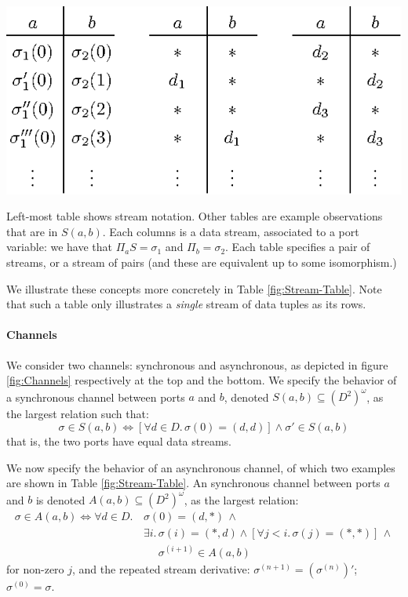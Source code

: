 \begin{table}[b]
	\begin{center}
		\includegraphics[scale=0.8]{pic/stream-table}
	\end{center}
	\caption{
		\label{fig:Stream-Table}Left-most table shows stream notation. Other tables are example observations that are in $S(a,b)$.  Each columns is a data stream, associated to a port variable: we have that $\Pi_a S=\sigma_1$ and $\Pi_b=\sigma_2$. Each table specifies a pair of streams, or a stream of pairs (and these are equivalent up to some isomorphism.)}
\end{table}

We illustrate these concepts more concretely in Table \ref{fig:Stream-Table}.
Note that such a table only illustrates a \emph{single} stream of data tuples as its rows.

\paragraph{Channels} We consider two channels: synchronous and asynchronous,
as depicted in figure \ref{fig:Channels} respectively at the top and the bottom.
We specify the behavior of a synchronous channel between ports $a$ and $b$, denoted $S(a,b)\subseteq(D^2)^{\omega}$, as the largest relation such that:
$$\sigma\in S(a,b)\Leftrightarrow\left[\forall d\in D.\,\sigma(0)=(d,d)\right]\land\sigma'\in S(a,b)$$
that is, the two ports have equal data streams.

We now specify the behavior of an asynchronous channel, of which two examples are shown
in Table \ref{fig:Stream-Table}. An synchronous channel between ports $a$ and $b$ is denoted $A(a,b)\subseteq(D^2)^{\omega}$,
as the largest relation:
\begin{align*}
	\sigma\in A(a,b)\Leftrightarrow\forall d\in D.\, & \sigma(0)=(d,*)\,\land\\
	& \exists i.\,\sigma(i)=(*,d)\land\left[\forall j<i.\,\sigma(j)=(*,*)\right]\,\land\\
	& \phantom{\exists i.\,}\sigma^{(i+1)}\in A(a,b)
\end{align*}
for non-zero $j$, and the repeated stream derivative: $\sigma^{(n+1)}=\left(\sigma^{(n)}\right)'$; $\sigma^{(0)}=\sigma$.

